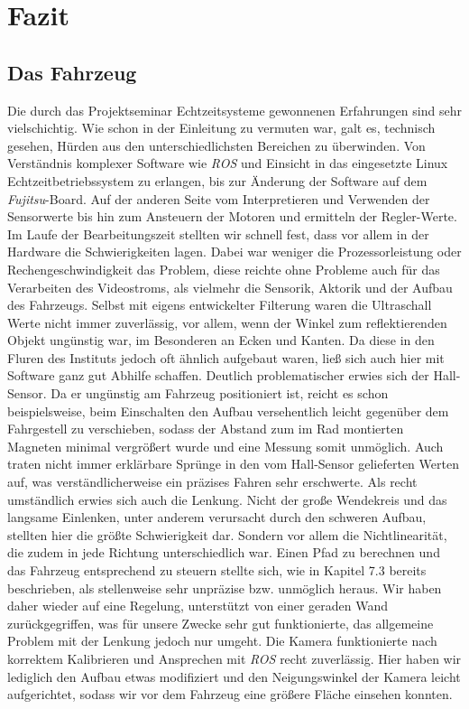 \section{Fazit}
\label{sec:fazit}
\subsection{Das Fahrzeug}
Die durch das Projektseminar Echtzeitsysteme gewonnenen Erfahrungen sind sehr vielschichtig. Wie schon in der Einleitung zu vermuten war, galt es, technisch gesehen, Hürden aus den unterschiedlichsten Bereichen zu überwinden. Von Verständnis komplexer Software wie \textit{ROS} und Einsicht in das eingesetzte Linux Echtzeitbetriebssystem zu erlangen, bis zur Änderung der Software auf dem \textit{Fujitsu}-Board. Auf der anderen Seite vom Interpretieren und Verwenden der Sensorwerte bis hin zum Ansteuern der Motoren und ermitteln der Regler-Werte.
\newline
\newline 
Im Laufe der Bearbeitungszeit stellten wir schnell fest, dass vor allem in der Hardware die Schwierigkeiten lagen. Dabei war weniger die Prozessorleistung oder Rechengeschwindigkeit das Problem, diese reichte ohne Probleme auch für das Verarbeiten des Videostroms, als vielmehr die Sensorik, Aktorik und der Aufbau des Fahrzeugs. Selbst mit eigens entwickelter Filterung waren die Ultraschall Werte nicht immer zuverlässig, vor allem, wenn der Winkel zum reflektierenden Objekt ungünstig war, im Besonderen an Ecken und Kanten. Da diese in den Fluren des Instituts jedoch oft ähnlich aufgebaut waren, ließ sich auch hier mit Software ganz gut Abhilfe schaffen. 
\newline
\newline
Deutlich problematischer erwies sich der Hall-Sensor. Da er ungünstig am Fahrzeug positioniert ist, reicht es schon beispielsweise, beim Einschalten den Aufbau versehentlich leicht gegenüber dem Fahrgestell zu verschieben, sodass der Abstand zum im Rad montierten Magneten minimal vergrößert wurde und eine Messung somit unmöglich. Auch traten nicht immer erklärbare Sprünge in den vom Hall-Sensor gelieferten Werten auf, was verständlicherweise ein präzises Fahren sehr erschwerte. 
\newline
\newline
Als recht umständlich erwies sich auch die Lenkung. Nicht der große Wendekreis und das langsame Einlenken, unter anderem verursacht durch den schweren Aufbau, stellten hier die größte Schwierigkeit dar. Sondern vor allem die Nichtlinearität, die zudem in jede Richtung unterschiedlich war. Einen Pfad zu berechnen und das Fahrzeug entsprechend zu steuern stellte sich, wie in Kapitel 7.3 bereits beschrieben, als stellenweise sehr unpräzise bzw. unmöglich heraus. Wir haben daher wieder auf eine Regelung, unterstützt von einer geraden Wand zurückgegriffen, was für unsere Zwecke sehr gut funktionierte, das allgemeine Problem mit der Lenkung jedoch nur umgeht. Die Kamera funktionierte nach korrektem Kalibrieren und Ansprechen mit \textit{ROS} recht zuverlässig. Hier haben wir lediglich den Aufbau etwas modifiziert und den Neigungswinkel der Kamera leicht aufgerichtet, sodass wir vor dem Fahrzeug eine größere Fläche einsehen konnten.

